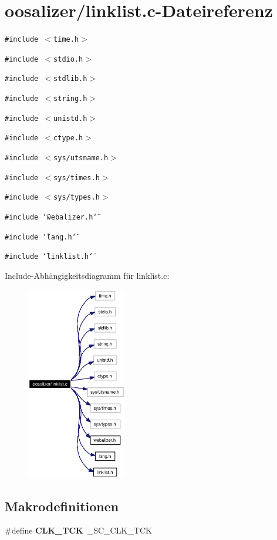 \section{oosalizer/linklist.c-Dateireferenz}
\label{linklist_8c}
{\tt \#include $<$time.h$>$}\par
{\tt \#include $<$stdio.h$>$}\par
{\tt \#include $<$stdlib.h$>$}\par
{\tt \#include $<$string.h$>$}\par
{\tt \#include $<$unistd.h$>$}\par
{\tt \#include $<$ctype.h$>$}\par
{\tt \#include $<$sys/utsname.h$>$}\par
{\tt \#include $<$sys/times.h$>$}\par
{\tt \#include $<$sys/types.h$>$}\par
{\tt \#include \char`\"{}webalizer.h\char`\"{}}\par
{\tt \#include \char`\"{}lang.h\char`\"{}}\par
{\tt \#include \char`\"{}linklist.h\char`\"{}}\par


Include-Abh\"{a}ngigkeitsdiagramm f\"{u}r linklist.c:\begin{figure}[H]
\begin{center}
\leavevmode
\includegraphics[width=124pt]{linklist_8c__incl}
\end{center}
\end{figure}
\subsection*{Makrodefinitionen}
\begin{CompactItemize}
\item 
\#define {\bf CLK\_\-TCK}~\_\-SC\_\-CLK\_\-TCK
\end{CompactItemize}
